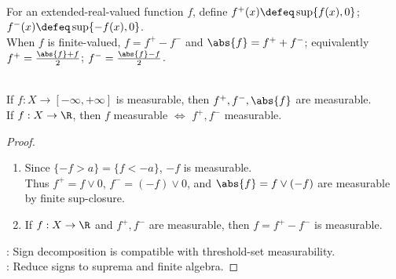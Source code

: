 \begin{definition} \label{def:positive-negative-parts-measurable-functions} \\
For an extended-real-valued function $f$, define $f^+(x)\defeq\sup\{f(x),0\}$; $f^-(x)\defeq\sup\{-f(x),0\}$.\\
When $f$ is finite-valued, $f=f^+-f^-$ and $\abs{f}=f^++f^-$; equivalently $f^+=\frac{\abs{f}+f}{2}$; $f^-=\frac{\abs{f}-f}{2}$.
\end{definition}

\begin{corollary} \label{cor:positive-negative-parts-measurable} \\
If $f:X\to[-\infty,+\infty]$ is measurable, then $f^+,f^-,\abs{f}$ are measurable.\\
If $f:X\to\R$, then $f$ measurable $\Longleftrightarrow$ $f^+,f^-$ measurable.
\begin{proof}
\begin{enumerate}[label=\roman*.]
\setlength{\itemsep}{0pt}
\item[$(\Rightarrow)$] Since $\{-f>a\}=\{f<-a\}$, $-f$ is measurable.\\
Thus $f^+=f\vee0$, $f^-=(-f)\vee0$, and $\abs{f}=f\vee(-f)$ are measurable by finite sup-closure.
\item[$(\Leftarrow)$] If $f:X\to\R$ and $f^+,f^-$ are measurable, then $f=f^+-f^-$ is measurable.
\end{enumerate}
: Sign decomposition is compatible with threshold-set measurability.\\
: Reduce signs to suprema and finite algebra.
\end{proof}
\end{corollary}

